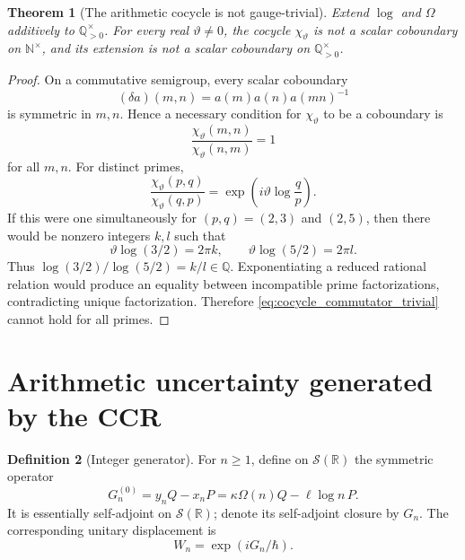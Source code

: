 \documentclass[11pt]{amsart}
\numberwithin{equation}{section}
\theoremstyle{plain}
\newtheorem{theorem}{Theorem}[section]
\theoremstyle{definition}
\newtheorem{definition}[theorem]{Definition}
\theoremstyle{remark}
\newcommand{\R}{\mathbb{R}}
\newcommand{\Sch}{\mathcal{S}}
\begin{document}
\begin{theorem}[The arithmetic cocycle is not gauge-trivial]
\label{thm:cocycle_nontrivial}
Extend \(\log\) and \(\Omega\) additively to
\(\mathbb Q_{>0}^{\times}\).  For every real \(\vartheta\ne0\), the
cocycle \(\chi_\vartheta\) is not a scalar coboundary on
\(\mathbb N^{\times}\), and its extension is not a scalar coboundary on
\(\mathbb Q_{>0}^{\times}\).
\end{theorem}

\begin{proof}
On a commutative semigroup, every scalar coboundary
\begin{equation}
(\delta a)(m,n)=a(m)a(n)a(mn)^{-1}
\label{eq:scalar_coboundary}
\end{equation}
is symmetric in \(m,n\).  Hence a necessary condition for
\(\chi_\vartheta\) to be a coboundary is
\begin{equation}
\frac{\chi_\vartheta(m,n)}{\chi_\vartheta(n,m)}=1
\label{eq:cocycle_commutator_trivial}
\end{equation}
for all \(m,n\).  For distinct primes,
\begin{equation}
\frac{\chi_\vartheta(p,q)}{\chi_\vartheta(q,p)}
=
\exp\left(i\vartheta\log\frac{q}{p}\right).
\label{eq:prime_cocycle_commutator}
\end{equation}
If this were one simultaneously for \((p,q)=(2,3)\) and \((2,5)\), then
there would be nonzero integers \(k,l\) such that
\begin{equation}
\vartheta\log(3/2)=2\pi k,
\qquad
\vartheta\log(5/2)=2\pi l.
\label{eq:two_prime_phase_integrality}
\end{equation}
Thus \(\log(3/2)/\log(5/2)=k/l\in\mathbb Q\).  Exponentiating a
reduced rational relation would produce an equality between incompatible
prime factorizations, contradicting unique factorization.  Therefore
\eqref{eq:cocycle_commutator_trivial} cannot hold for all primes.
\end{proof}

\section{Arithmetic uncertainty generated by the CCR}
\label{sec:arithmetic_uncertainty}

\begin{definition}[Integer generator]
\label{def:integer_generator}
For \(n\ge1\), define on \(\Sch(\R)\) the symmetric operator
\begin{equation}
G_n^{(0)}=y_nQ-x_nP
=\kappa\Omega(n)Q-\ell\log n\,P.
\label{eq:Gn_definition}
\end{equation}
It is essentially self-adjoint on \(\Sch(\R)\); denote its self-adjoint
closure by \(G_n\).  The corresponding unitary displacement is
\begin{equation}
W_n=\exp(iG_n/\hbar).
\label{eq:Wn_from_Gn}
\end{equation}
\end{definition}
\end{document}
